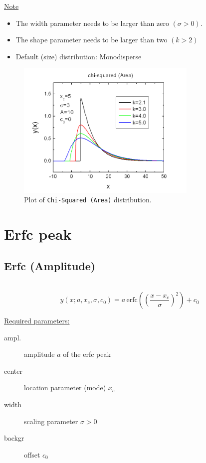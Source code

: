 \uline{Note}
\begin{itemize}
  \item The width parameter needs to be larger than zero $(\sigma>0)$.
  \item The shape parameter needs to be larger than two $(k>2)$
  \item Default (size) distribution: Monodisperse
\end{itemize}
\begin{figure}[htb]
\begin{center}
\includegraphics[width=0.768\textwidth]{ChiSquaredArea.png}
\end{center}
\caption{Plot of \texttt{Chi-Squared (Area)} distribution.}
\label{fig:ChiSquaredArea}
\end{figure}

\clearpage
\section{Erfc peak}
\label{sec:ErfcPeak}
\subsection{Erfc (Amplitude)} \hspace{1pt} \\
\label{sec:ErfcPeakAmplitude}
\begin{equation}
y(x;a,x_c,\sigma,c_0) = a \, \textrm{erfc}\left(\left(\frac{x-x_c}{\sigma}\right)^2\right)+c_0
\end{equation}
\vspace{5mm}

\uline{Required parameters:}
\begin{description}
    \item[ampl.] amplitude $a$ of the erfc peak
    \item[center] location parameter (mode) $x_c$
    \item[width] scaling parameter $\sigma>0$
    \item[backgr] offset $c_0$
\end{description}


